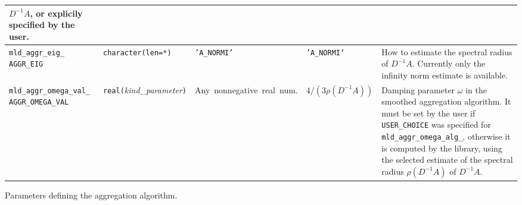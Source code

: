 \begin{center}
\begin{tabular}{|p{5cm}|l|p{2.4cm}|p{2.4cm}|p{6cm}|}
                         $D^{-1}A$, or explicily
                         specified by the user. \\ \hline
\verb|mld_aggr_eig_|  \break \verb|AGGR_EIG|    & \verb|character(len=*)|
                         & \texttt{'A\_NORMI'}
                         & \texttt{'A\_NORMI'}
                         & How to estimate the spectral radius of $D^{-1}A$.
                           Currently only the infinity norm estimate
                           is available. \\ \hline
\verb|mld_aggr_omega_val_| \break \verb|AGGR_OMEGA_VAL|    & \verb|real(|\emph{kind\_parameter}\verb|)|
                         & Any~nonnegative~real~num.
                         & $4/(3\rho(D^{-1}A))$
                         & Damping parameter $\omega$ in the smoothed aggregation algorithm. 
                           It must be set by the user if
                           \verb|USER_CHOICE| was specified for 
                           \verb|mld_aggr_omega_alg_|,
                           otherwise it is computed by the library, using the
                           selected estimate of the spectral radius $\rho(D^{-1}A)$ of
                           $D^{-1}A$.\\
\hline
\end{tabular}
\end{center}
\caption{Parameters defining the aggregation algorithm.
\label{tab:p_aggregation}} 
\esideways
                     
